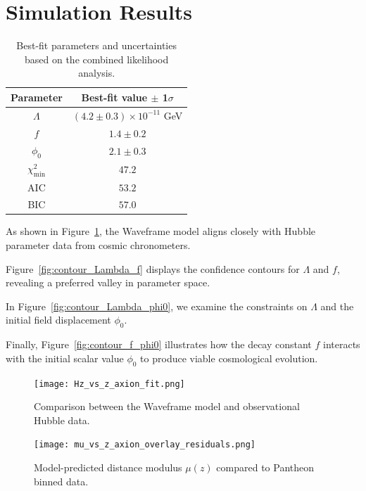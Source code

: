 \documentclass[12pt]{article}
\begin{document}
\section{Simulation Results}

\begin{table}[ht]
\centering
\caption{Best-fit parameters and uncertainties based on the combined likelihood analysis.}
\begin{tabular}{|c|c|}
\hline
Parameter & Best-fit value $\pm$ 1$\sigma$ \\
\hline
$\Lambda$ & $(4.2 \pm 0.3) \times 10^{-11}$ GeV \\
$f$       & $1.4 \pm 0.2$ \\
$\phi_0$  & $2.1 \pm 0.3$ \\
$\chi^2_\mathrm{min}$ & $47.2$ \\
AIC & $53.2$ \\
BIC & $57.0$ \\
\hline
\end{tabular}
\label{tab:params}
\end{table}



As shown in Figure~\ref{fig:Hz_fit}, the Waveframe model aligns closely with Hubble parameter data from cosmic chronometers.

Figure~\ref{fig:contour_Lambda_f} displays the confidence contours for $\Lambda$ and $f$, revealing a preferred valley in parameter space.

In Figure~\ref{fig:contour_Lambda_phi0}, we examine the constraints on $\Lambda$ and the initial field displacement $\phi_0$.

Finally, Figure~\ref{fig:contour_f_phi0} illustrates how the decay constant $f$ interacts with the initial scalar value $\phi_0$ to produce viable cosmological evolution.


\begin{figure}[ht]
\centering
\texttt{[image: Hz\_vs\_z\_axion\_fit.png]}
\caption{Comparison between the Waveframe model and observational Hubble data.}
\label{fig:Hz_fit}
\end{figure}

\begin{figure}[ht]
\centering
\texttt{[image: mu\_vs\_z\_axion\_overlay\_residuals.png]}
\caption{Model-predicted distance modulus $\mu(z)$ compared to Pantheon binned data.}
\label{fig:mu_fit}
\end{figure}
\end{document}
